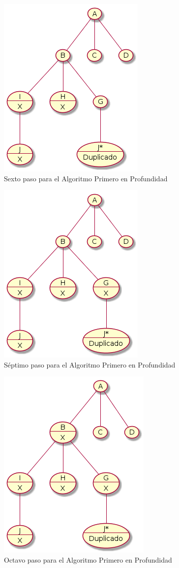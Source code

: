 \documentclass{article}
\begin{document}
\begin{figure}[H]
  \centering
  \includegraphics[width=.4\linewidth]{EJ3/profundidad_005.png}
  \caption{Sexto paso para el Algoritmo Primero en Profundidad}
  \label{gr:g7}
\end{figure}
\begin{figure}[H]
  \centering
  \includegraphics[width=.4\linewidth]{EJ3/profundidad_006.png}
  \caption{S\'eptimo paso para el Algoritmo Primero en Profundidad}
  \label{gr:g8}
\end{figure}
\begin{figure}[H]
  \centering
  \includegraphics[width=.4\linewidth]{EJ3/profundidad_007.png}
  \caption{Octavo paso para el Algoritmo Primero en Profundidad}
  \label{gr:g9}
\end{figure}
\end{document}
